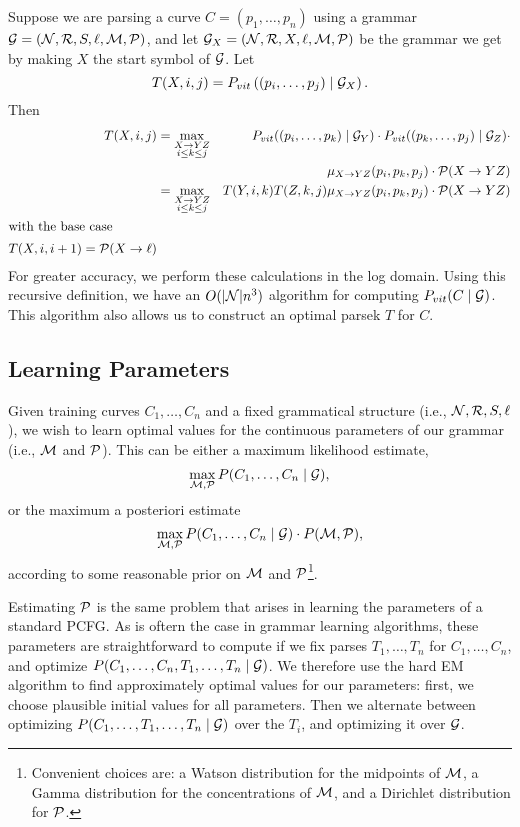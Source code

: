 \documentclass[10pt]{article}
\begin{document}
Suppose we are parsing a curve $C=(p_1,\dots,p_n)$ using a grammar
${\mathcal G} = ({\mathcal N}, {\mathcal R}, S, \ell, {\mathcal M}, {\mathcal P})$, and let ${\mathcal G}_X = ({\mathcal N},
{\mathcal R}, X, \ell, {\mathcal M}, {\mathcal P})$ be the grammar we get by making $X$ the
start symbol of ${\mathcal G}$. Let 
$$T(X,i,j) = P_{vit}\left( (p_i,\dots,p_j) \mid {\mathcal G}_X \right).$$
Then
\begin{align*}
T(X,i,j) &= \max_{\substack{X\to YZ\\ i\le k\le j}} &P_{vit}( (p_i,\dots,p_k)\mid
{\mathcal G}_Y) \cdot P_{vit}((p_k,\dots,p_j) \mid {\mathcal G}_Z) \cdot \\
& & \mu_{X\to YZ}(p_i,p_k,p_j) \cdot {\mathcal P}(X\to YZ) \\
&= \max_{\substack{X\to YZ\\ i\le k\le j}} & T(Y,i,k) T(Z,k,j) \mu_{X\to YZ}(p_i,p_k,p_j) \cdot {\mathcal P}(X\to YZ) \\
\intertext{with the base case}
T(X,i,i+1) = {\mathcal P}(X\to \ell)
\end{align*}
For greater accuracy, we perform these calculations in the log domain.
Using this recursive definition, we have an $O(|{\mathcal N}| n^3)$ algorithm
for computing $P_{vit}(C\mid {\mathcal G})$. This algorithm also allows us to
construct an optimal parsek $T$ for $C$.


\subsection{Learning Parameters}

Given training curves $C_1,\dots,C_n$ and a fixed grammatical
structure (i.e., ${\mathcal N},{\mathcal R},S,\ell$), we wish to learn optimal values
for the continuous parameters of our grammar (i.e., ${\mathcal M}$ and
${\mathcal P}$). This can be either a maximum likelihood estimate,
$$\max_{{\mathcal M},{\mathcal P}} P(C_1,\dots,C_n\mid {\mathcal G}),$$
or the maximum a posteriori estimate
$$\max_{{\mathcal M},{\mathcal P}} P(C_1,\dots,C_n\mid {\mathcal G}) \cdot P({\mathcal M},{\mathcal P}),$$
according to some reasonable prior on ${\mathcal M}$ and ${\mathcal P}$\footnote{
  Convenient choices are: a Watson distribution for the midpoints of
  ${\mathcal M}$, a Gamma distribution for the concentrations of ${\mathcal M}$, and a
  Dirichlet distribution for ${\mathcal P}$.}.

Estimating ${\mathcal P}$ is the same problem that arises in learning the
parameters of a standard PCFG. As is oftern the case in grammar
learning algorithms, these parameters are straightforward to compute
if we fix parses $T_1,\dots,T_n$ for $C_1,\dots,C_n$, and optimize
$P(C_1,\dots,C_n, T_1,\dots, T_n \mid {\mathcal G})$. We therefore use the
hard EM algorithm to find approximately optimal values for our
parameters: first, we choose plausible initial values for all
parameters. Then we alternate between optimizing
$P(C_1,\dots,T_1,\dots,T_n\mid {\mathcal G})$ over the $T_i$, and optimizing
it over ${\mathcal G}$.
\end{document}
